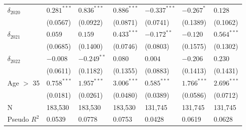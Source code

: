 \begin{tabular}{lllllll}
$\delta_{2020}$               &   $0.281^{***}$ &   $0.836^{***}$ &   $0.886^{***}$ &  $-0.337^{***}$ &      $-0.267^*$ &         $0.128$ \\
                              &        (0.0567) &        (0.0922) &        (0.0871) &        (0.0741) &        (0.1389) &        (0.1062) \\
$\delta_{2021}$               &         $0.059$ &         $0.159$ &   $0.433^{***}$ &   $-0.172^{**}$ &        $-0.120$ &   $0.564^{***}$ \\
                              &        (0.0685) &        (0.1400) &        (0.0746) &        (0.0803) &        (0.1575) &        (0.1302) \\
$\delta_{2022}$               &        $-0.008$ &   $-0.249^{**}$ &         $0.080$ &         $0.004$ &        $-0.206$ &         $0.230$ \\
                              &        (0.0611) &        (0.1182) &        (0.1355) &        (0.0883) &        (0.1413) &        (0.1431) \\
Age $>$ 35                    &   $0.758^{***}$ &   $1.957^{***}$ &   $3.006^{***}$ &   $0.585^{***}$ &   $1.766^{***}$ &   $2.696^{***}$ \\
                              &        (0.0181) &        (0.0261) &        (0.0480) &        (0.0389) &        (0.0586) &        (0.0712) \\
N                             &         183,530 &         183,530 &         183,530 &         131,745 &         131,745 &         131,745 \\
Pseudo $R^2$                  &          0.0539 &          0.0778 &          0.0753 &          0.0428 &          0.0619 &          0.0628 \\
\bottomrule
\end{tabular}

